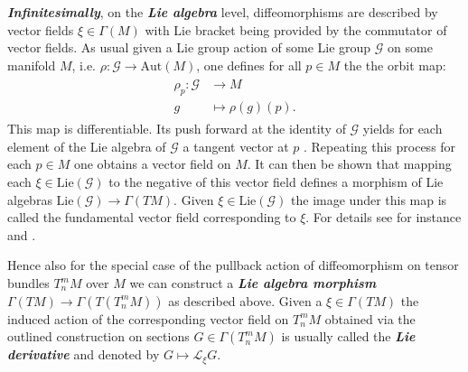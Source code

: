 \documentclass[a4paper,12pt, DIV=14, BCOR=5mm, twoside, headsepline, numbers=noenddot]{scrbook}
\begin{document}
\textit{\textbf{Infinitesimally}}, on the \textbf{\textit{Lie algebra}} level, diffeomorphisms are described by vector fields $\xi \in \Gamma(M)$ with Lie bracket being provided by the commutator of vector fields. 
As usual given a Lie group action of some Lie group $\mathcal{G}$ on some manifold $M$, i.e. $\rho : \mathcal{G} \rightarrow \mathrm{Aut}(M)$, one defines for all $p \in M$ the the orbit map:
\begin{align}
    \begin{aligned}
    \rho_p : \mathcal{G} &\longrightarrow M \\
    g &\longmapsto \rho(g)(p).
    \end{aligned}
\end{align}
This map is differentiable. Its push forward at the identity of $\mathcal{G}$ yields for each element of the Lie algebra of $\mathcal{G}$ a tangent vector at $p$ . Repeating this process for each $p \in M$ one obtains a vector field on $M$. It can then be shown that mapping each $\xi \in \mathrm{Lie}(\mathcal{G})$ to the negative of this vector field defines a morphism of Lie algebras $\mathrm{Lie}(\mathcal{G}) \rightarrow \Gamma(TM)$. Given $\xi \in \mathrm{Lie}(\mathcal{G})$ the image under this map is called the fundamental vector field corresponding to $\xi$. For details see for instance \cite{boothby1989} and \cite{doi:10.1142/3867}.

Hence also for the special case of the pullback action of diffeomorphism on tensor bundles $T^m_nM$ over $M$ we can construct a \textit{\textbf{Lie algebra morphism}} $\Gamma(TM) \rightarrow \Gamma(T(T^m_nM))$ as described above. Given a $\xi \in \Gamma(TM)$ the induced action of the corresponding vector field on $T^m_nM$ obtained via the outlined construction on sections $G \in \Gamma(T^m_nM)$ is usually called the \textit{\textbf{Lie derivative}} and denoted by $G \mapsto \mathcal{L}_{\xi}G$. 
\end{document}
